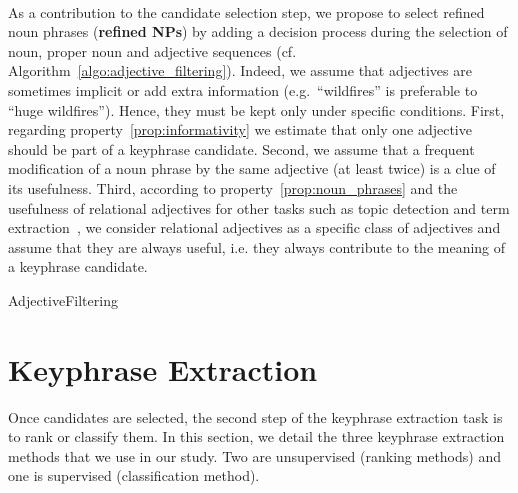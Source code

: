   \paragraph{}
  \hspace{-1em}As a contribution to the candidate selection step, we propose to
  select refined noun phrases (\textbf{refined NPs}) by adding a decision
  process during the selection of noun, proper noun and adjective sequences (cf.
  Algorithm~\ref{algo:adjective_filtering}). Indeed, we assume that adjectives
  are sometimes implicit or add extra information (e.g.~``wildfires'' is
  preferable to ``huge wildfires''). Hence, they must be kept only under
  specific conditions. First, regarding property~\ref{prop:informativity} we
  estimate that only one adjective should be part of a keyphrase candidate.
  Second, we assume that a frequent modification of a noun phrase by the same
  adjective (at least twice) is a clue of its usefulness. Third, according to
  property~\ref{prop:noun_phrases} and the usefulness of relational adjectives
  for other tasks such as topic detection and term
  extraction~\cite{daille2001relationaladjectives}, we consider relational
  adjectives as a specific class of adjectives and assume that they are always
  useful, i.e. they always contribute to the meaning of a keyphrase candidate.
  \begin{algorithm}
    \DontPrintSemicolon{}

    \BlankLine


    \caption{AdjectiveFiltering
             \label{algo:adjective_filtering}}
  \end{algorithm}

\section{Keyphrase Extraction}
\label{sec:keyphrase_extraction}
  Once candidates are selected, the second step of the keyphrase extraction task
  is to rank or classify them. In this section, we detail the three keyphrase
  extraction methods that we use in our study. Two are unsupervised (ranking
  methods) and one is supervised (classification method).

